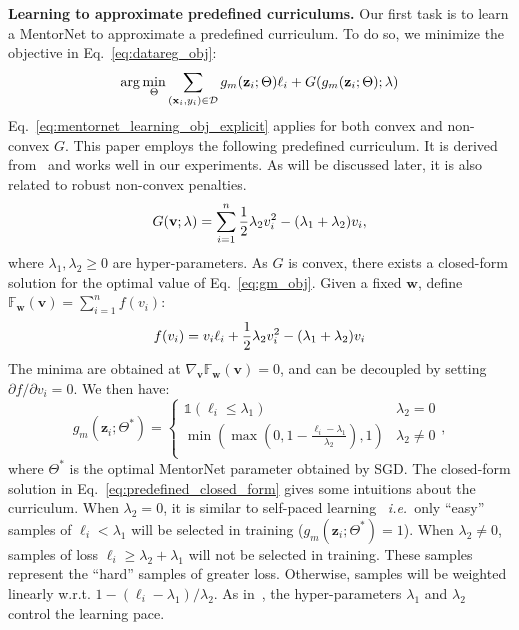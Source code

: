 \documentclass{article}
\newcommand{\ie}{\emph{i.e.}} \newcommand{\Ie}{\emph{I.e}}
\begin{document}
\textbf{Learning to approximate predefined curriculums.} Our first task is to learn a MentorNet to approximate a predefined curriculum. To do so, we minimize the objective in Eq.~\eqref{eq:datareg_obj}:
\vspace{-2mm}
\begin{equation}
\label{eq:mentornet_learning_obj_explicit}
\arg\min_{\Theta}  
\sum_{(\mathbf{x}_i,y_i) \in \mathcal{D}} g_m (\mathbf{z}_i;\Theta) \ell_i +  G(g_m (\mathbf{z}_i; \Theta); \lambda)
\vspace{-1mm}
\end{equation}
Eq.~\eqref{eq:mentornet_learning_obj_explicit} applies for both convex and non-convex $G$. This paper employs the following predefined curriculum. It is derived from~\cite{jiang2015self} and works well in our experiments. As will be discussed later, it is also related to robust non-convex penalties. 
\vspace{-3mm}
\begin{equation}
\label{eq:predefined_curriculum}
G(\mathbf{v}; \lambda) = \sum_{i=1}^n  \frac{1}{2} \lambda_2 v_i^2  - (\lambda_1+\lambda_2) v_i,
\vspace{-1mm}
\end{equation}
where $\lambda_1, \lambda_2 \ge 0$ are hyper-parameters. As $G$ is convex, there exists a closed-form solution for the optimal value of Eq.~\eqref{eq:gm_obj}. Given a fixed $\mathbf{w}$, define $\mathbb{F}_{\mathbf{w}}(\mathbf{v}) = \sum_{i=1}^n f(v_i)$:
\vspace{-2mm}
\begin{equation}
f(v_i) = v_i \ell_i + \frac{1}{2} \lambda_2 v_i^2 - (\lambda_1+\lambda_2) v_i
\vspace{-2mm}
\end{equation}
The minima are obtained at $\nabla_{\mathbf{v}} \mathbb{F}_{\mathbf{w}} (\mathbf{v}) = 0$, and can be decoupled by setting $\partial f / \partial v_i = 0$. We then have:
\begin{equation}
\label{eq:predefined_closed_form}
g_m(\mathbf{z}_i; \Theta^*) =\begin{cases}
\mathds{1}(\ell_i \le \lambda_1)  &  \lambda_2 = 0 \\
\min(\max (0, 1- \frac{\ell_i - \lambda_1}{\lambda_2}), 1) & \lambda_2 \ne 0\\
\end{cases},
\end{equation}
where $\Theta^*$ is the optimal MentorNet parameter obtained by SGD. The closed-form solution in Eq.~\eqref{eq:predefined_closed_form} gives some intuitions about the curriculum. When $\lambda_2=0$, it is similar to self-paced learning~\cite{kumar2010self} \ie~only ``easy'' samples of $\ell_i < \lambda_1$ will be selected in training ($g_m(\mathbf{z}_i; \Theta^*)=1$). When $\lambda_2 \ne 0$, samples of loss $\ell_i \ge \lambda_2 + \lambda_1$ will not be selected in training. These samples represent the ``hard'' samples of greater loss. Otherwise, samples will be weighted linearly w.r.t. $1-(\ell_i-\lambda_1)/\lambda_2$. As in~\cite{kumar2010self}, the hyper-parameters $\lambda_1$ and $\lambda_2$ control the learning pace.
\end{document}
